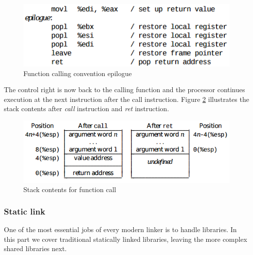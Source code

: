                \begin{figure}[H]
                    \centering                    \includegraphics[scale = 0.5]
                    {Images/concepts/FCCepilogue.png}
                    \caption[Function calling convention epilogue]%
                    {Function calling convention epilogue\cite{SCO-386}}    
                    \label{fig:FCCepilogue}
              \end{figure}
              
       The control right is now back to the calling function and the processor continues execution at the next instruction after the call instruction. Figure \ref{fig:FCCret} illustrates the stack contents after \textit{call} instruction and \textit{ret} instruction.
       
               \begin{figure}[H]
                    \centering
                    \includegraphics[scale = 0.45]
                    {Images/concepts/FCCret.png}
                    \caption[Stack contents for function call]%
                    {Stack contents for function call\cite{SCO-386}}    
                    \label{fig:FCCret}
              \end{figure}
              
       \subsubsection{Static link}
       One of the most essential jobs of every modern linker is to handle libraries\cite{LAL-00}. In this part we cover traditional statically linked libraries, leaving the more complex shared libraries next. 
       
